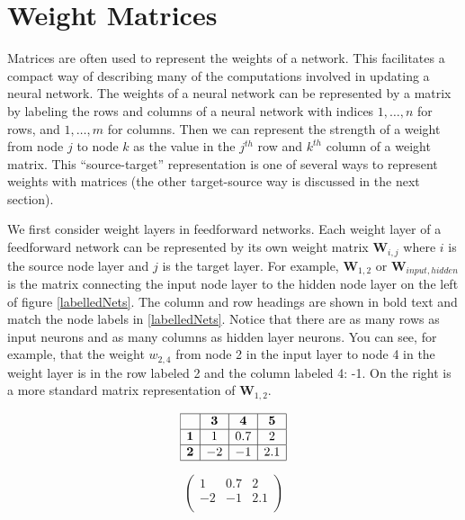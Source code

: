 \section{Weight Matrices}\label{weightMatrices}

Matrices are often used to represent the weights of a network. This facilitates a compact way of describing many of the computations involved in updating a neural network. The weights of a neural network can be represented by a matrix by labeling the rows and columns of a neural network with indices $1,\dots,n$ for rows, and $1,\dots,m$ for columns. Then we can represent the strength of a weight from node $j$ to node $k$ as the value in the $j^{th}$ row and $k^{th}$ column of a weight matrix.  This ``source-target'' representation is one of several ways to represent weights with matrices (the other target-source way is discussed in the next section).

We first consider weight layers in feedforward networks. Each weight layer of a feedforward network can be represented by its own weight matrix $\textbf{W}_{i,j}$ where $i$ is the source node layer and $j$ is the target layer. For example, $\textbf{W}_{1,2}$ or $\textbf{W}_{input,hidden}$ is the matrix connecting the input node layer to the hidden node layer on the left of figure \ref{labelledNets}. The column and row headings are shown in bold text and match the node labels in \ref{labelledNets}. Notice that there are as many rows as input neurons and as many columns as hidden layer neurons. You can see, for example, that the weight $w_{2,4}$ from node 2 in the input layer to node 4 in the weight layer is in the row labeled 2 and the column labeled 4: -1. On the right is a more standard matrix representation of $\textbf{W}_{1,2}$.

\begin{minipage}{0.5\textwidth}
\centering
\[
\begin{array}{|c|c|c|c|}
\hline
\multicolumn{1}{|c|}{} & \textbf{3} & \textbf{4} & \textbf{5} \\
\hline
\textbf{1} & 1 & 0.7 & 2 \\
\hline
\textbf{2} & -2 & -1 & 2.1 \\
\hline
\end{array}
\]
\end{minipage}
\begin{minipage}{0.5\textwidth}
\centering
\[
\begin{pmatrix}
1 & 0.7 & 2 \\
-2 & -1 & 2.1 \\
\end{pmatrix}
\]
\end{minipage}
\vspace*{.1cm} 

